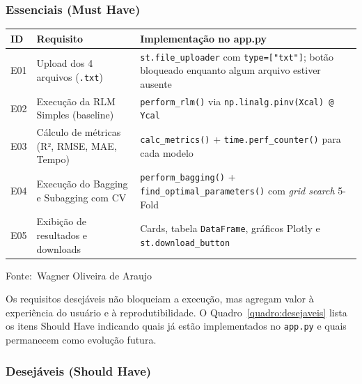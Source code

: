 \documentclass[12pt,a4paper]{article}
\newcommand{\oautor}{Wagner Oliveira de Araujo}
\begin{document}
\subsubsection{Essenciais (Must Have)}

\begin{quadro}[ht]
\centering
\small
\caption{Requisitos essenciais do sistema (Must Have)}
\label{quadro:essenciais}
\begin{threeparttable}
\begin{tabularx}{\textwidth}{|l|X|X|} \hline
\textbf{ID} & \textbf{Requisito} & \textbf{Implementação no app.py} \\ \hline
E01 & Upload dos 4 arquivos (\texttt{.txt}) & \texttt{st.file\_uploader} com \texttt{type=["txt"]}; botão bloqueado enquanto algum arquivo estiver ausente \\ \hline
E02 & Execução da RLM Simples (baseline) & \texttt{perform\_rlm()} via \texttt{np.linalg.pinv(Xcal) @ Ycal} \\ \hline
E03 & Cálculo de métricas (R², RMSE, MAE, Tempo) & \texttt{calc\_metrics()} + \texttt{time.perf\_counter()} para cada modelo \\ \hline
E04 & Execução do Bagging e Subagging com CV & \texttt{perform\_bagging()} + \texttt{find\_optimal\_parameters()} com \textit{grid search} 5-Fold \\ \hline
E05 & Exibição de resultados e downloads & Cards, tabela \texttt{DataFrame}, gráficos Plotly e \texttt{st.download\_button} \\ \hline
\end{tabularx}
\begin{tablenotes}[flushleft]
\footnotesize
\item Fonte:~\oautor
\end{tablenotes}
\end{threeparttable}
\end{quadro}

\newpage
Os requisitos desejáveis não bloqueiam a execução, mas agregam valor à experiência do usuário e à reprodutibilidade. O Quadro~\ref{quadro:desejaveis} lista os itens Should Have indicando quais já estão implementados no \texttt{app.py} e quais permanecem como evolução futura.

\subsubsection{Desejáveis (Should Have)}
\end{document}
